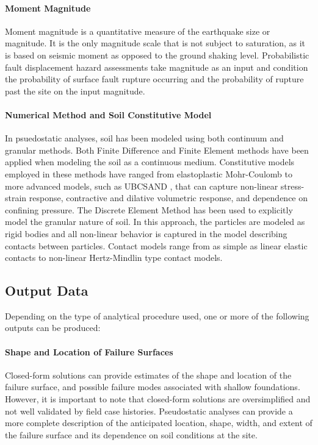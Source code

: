 \paragraph{Moment Magnitude}
Moment magnitude is a quantitative measure of the earthquake size or magnitude. It is the only magnitude scale that is not subject to saturation, as it is based on seismic moment as opposed to the ground shaking level. Probabilistic fault displacement hazard assessments take magnitude as an input and condition the probability of surface fault rupture occurring and the probability of rupture past the site on the input magnitude.

\paragraph{Numerical Method and Soil Constitutive Model}
In psuedostatic analyses, soil has been modeled using both continuum and granular methods. Both Finite Difference and Finite Element methods have been applied when modeling the soil as a continuous medium. Constitutive models employed in these methods have ranged from elastoplastic Mohr-Coulomb to more advanced models, such as UBCSAND \citep{byrne2004numerical}, that can capture non-linear stress-strain response, contractive and dilative volumetric response, and dependence on confining pressure. The Discrete Element Method has been used to explicitly model the granular nature of soil. In this approach, the particles are modeled as rigid bodies and all non-linear behavior is captured in the model describing contacts between particles. Contact models range from as simple as linear elastic contacts to non-linear Hertz-Mindlin type contact models.

\subsection{Output Data}
Depending on the type of analytical procedure used, one or more of the following outputs can be produced:\\[0.5em]

\paragraph{Shape and Location of Failure Surfaces}
Closed-form solutions can provide estimates of the shape and location of the failure surface, and possible failure modes associated with shallow foundations. However, it is important to note that closed-form solutions are oversimplified and not well validated by field case histories. Pseudostatic analyses can provide a more complete description of the anticipated location, shape, width, and extent of the failure surface and its dependence on soil conditions at the site. %

